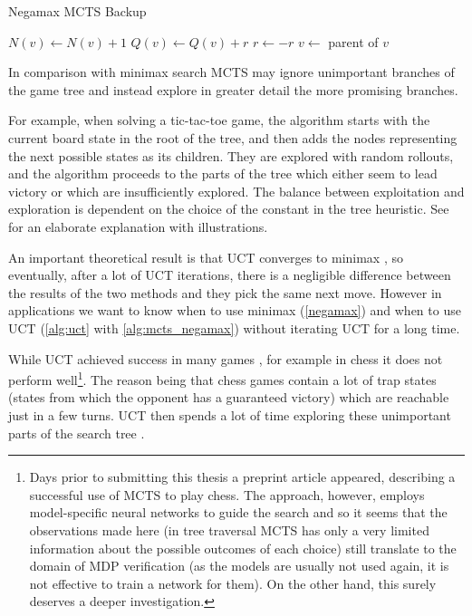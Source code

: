 \begin{algorithm}
\caption{Negamax MCTS Backup}
\label{alg:mcts_negamax}
\begin{algorithmic}[1]
        \State $N(v) \gets N(v) + 1$
        \State $Q(v) \gets Q(v) + r$
        \State $r \gets - r$
        \State $v \gets $ parent of $v$
    \EndWhile
\EndFunction
\end{algorithmic}
\end{algorithm}


In comparison with minimax search MCTS may ignore unimportant
branches of the game tree and instead explore in greater detail the more
promising branches.

For example, when solving a tic-tac-toe game, the algorithm starts with
the current board state in the root of the tree, and then adds
the nodes representing the next possible states as its children.
They are explored with random rollouts, and the algorithm proceeds to
the parts of the tree which either seem to lead victory or which are
insufficiently explored. The balance between exploitation and
exploration is dependent on the choice of the constant in the tree
heuristic. See \parencite{mcts_ttt} for an elaborate explanation with
illustrations.

An important theoretical result is
that UCT converges to minimax \parencite{Kocsis},
so eventually, after a lot of UCT iterations, there is a negligible
difference between the results of the two methods and they pick the same
next move. However in
applications we want to know when to use minimax (\autoref{negamax}) and
when to use UCT (\autoref{alg:uct} with \autoref{alg:mcts_negamax}) without
iterating UCT for a long time.

While UCT achieved success in many games \parencite{mcts_survey},
for example in chess it does not perform well\footnote{
    Days prior to submitting this thesis a preprint article
    \parencite{alphazero} appeared,
describing a successful use of MCTS to play chess. The approach,
however, employs model-specific neural networks to guide the search and
so it seems that the observations made here (in tree traversal MCTS has
only a very limited information about the possible outcomes of each
choice) still translate to the domain of MDP
verification (as the models are usually not used again, it is not
effective to train a network for them). On the other hand, this surely
deserves a deeper investigation.}. The reason being that chess
games contain a lot of trap states (states from which the opponent
has a guaranteed victory) which are reachable just in a few turns. UCT
then spends a lot of time exploring these unimportant parts of the search
tree \parencite{mcts_vs_chess}.

